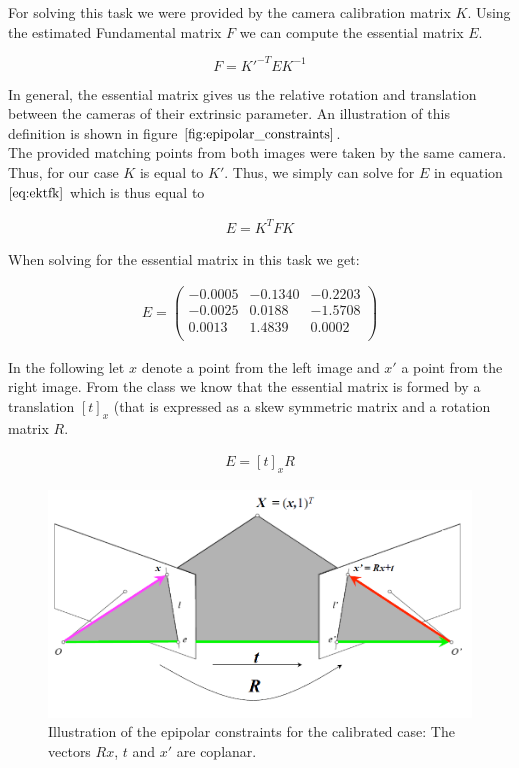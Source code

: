 \documentclass{paper}
\begin{document}
For solving this task we were provided by the camera calibration matrix $K$.  
Using the estimated Fundamental matrix $F$ we can compute the essential matrix $E$.

\begin{equation}
    F = K'^{-T} E K^{-1}
\label{eq:ektfk}
\end{equation}

In general, the essential matrix gives us the relative rotation and translation between the cameras of their extrinsic parameter. An illustration of this definition is shown in figure $\ref{fig:epipolar_constraints}$. \\

The provided matching points from both images were taken by the same camera. Thus, for our case $K$ is equal to $K'$. Thus, we simply can solve for $E$ in equation $\ref{eq:ektfk}$ which is thus equal to

\begin{align}
    E = K^{T} F K
\end{align}

When solving for the essential matrix in this task we get:

\begin{align}
E = 
\left(\begin{array}{rrr}
   -0.0005  & -0.1340 &  -0.2203 \\
   -0.0025  &  0.0188 &  -1.5708 \\
    0.0013  &  1.4839 &   0.0002 \\
\end{array} \right)
\end{align}

In the following let $x$ denote a point from the left image and $x'$ a point from the right image. From the class we know that the essential matrix is formed by a translation $[t]_x$ (that is expressed as a skew symmetric matrix and a rotation matrix $R$. 

\begin{align}
    E = [t]_x R 
\end{align}

\begin{figure}[h]
    \centering
    \includegraphics[width=\textwidth]{figures/epipol_const_cal_case}
    \caption{Illustration of the epipolar constraints for the calibrated case: The vectors $Rx$, $t$ and $x'$ are coplanar.}
    \label{fig:epipolar_constraints}
\end{figure}
\end{document}
